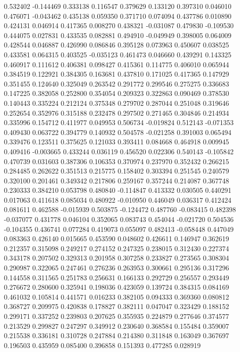 0.532402
-0.144469
0.333138
0.116547
0.379629
0.133120
0.397310
0.046010
0.476071
-0.043462
0.435138
0.059350
0.371710
0.074094
0.437786
0.010890
0.424131
0.046914
0.417365
0.008270
0.438321
-0.031087
0.479830
-0.109530
0.444075
0.027831
0.433535
0.082881
0.494910
-0.049949
0.398005
0.064009
0.428544
0.046887
0.426990
0.086846
0.395128
0.073963
0.450607
0.038525
0.433581
0.064315
0.403525
-0.035123
0.461473
0.046660
0.439291
0.143325
0.460917
0.111612
0.406381
0.098427
0.415361
0.114775
0.406010
0.065944
0.384519
0.122921
0.384305
0.163681
0.437810
0.171025
0.417365
0.147929
0.351455
0.124640
0.325049
0.263542
0.291772
0.299546
0.275275
0.336683
0.147225
0.382058
0.252800
0.354054
0.209323
0.322863
0.090469
0.378530
0.140443
0.335224
0.212124
0.375348
0.279702
0.287044
0.251048
0.319646
0.252654
0.352976
0.315188
0.232478
0.297502
0.271465
0.304846
0.214934
0.335996
0.154712
0.411977
0.049953
0.506734
-0.019824
0.512143
-0.071353
0.409430
0.063722
0.394779
0.140932
0.504578
-0.021258
0.391003
0.065494
0.339476
0.123511
0.375625
0.121033
0.393411
0.084668
0.464918
0.009945
0.409416
-0.003665
0.433244
0.036119
0.456520
0.022306
0.540143
-0.105842
0.470739
0.031603
0.387306
0.106353
0.370974
0.237970
0.352432
0.266215
0.284485
0.262622
0.351513
0.215775
0.158402
0.303394
0.251545
0.240579
0.320100
0.201461
0.349342
0.217806
0.259167
0.357244
0.214087
0.367748
0.230333
0.384210
0.053798
0.480840
-0.114847
0.413332
0.030505
0.440291
0.017063
0.411618
0.085034
0.480922
-0.010950
0.446049
0.036317
0.412424
0.081611
0.462588
-0.015939
0.503875
-0.124472
0.487760
-0.083415
0.482398
-0.037077
0.431778
0.046104
0.352065
0.083743
0.454044
-0.021720
0.504536
-0.104355
0.436741
0.077284
0.419073
0.055097
0.482413
-0.058448
0.447049
0.083363
0.426140
0.015665
0.453590
0.048602
0.426611
0.146947
0.362619
0.212357
0.315098
0.249217
0.274152
0.247325
0.238015
0.312430
0.227374
0.343178
0.207502
0.329313
0.201958
0.307258
0.233827
0.273565
0.308304
0.290987
0.322065
0.247461
0.276236
0.263953
0.300661
0.295136
0.317296
0.144558
0.311565
0.251783
0.256631
0.166133
0.292729
0.256557
0.293449
0.276672
0.280600
0.325941
0.198036
0.423059
0.139724
0.384315
0.084169
0.461032
0.105814
0.441571
0.016233
0.382105
0.094333
0.369360
0.080812
0.368727
0.209975
0.420838
0.178827
0.382111
0.047047
0.323429
0.188152
0.299171
0.337252
0.239803
0.207625
0.355935
0.224879
0.277646
0.374577
0.213529
0.299827
0.247297
0.349912
0.230640
0.368584
0.155484
0.359007
0.215538
0.336181
0.310728
0.247884
0.214380
0.311848
0.163049
0.367697
0.196503
0.435959
0.085400
0.396858
0.151393
0.477285
0.028919
